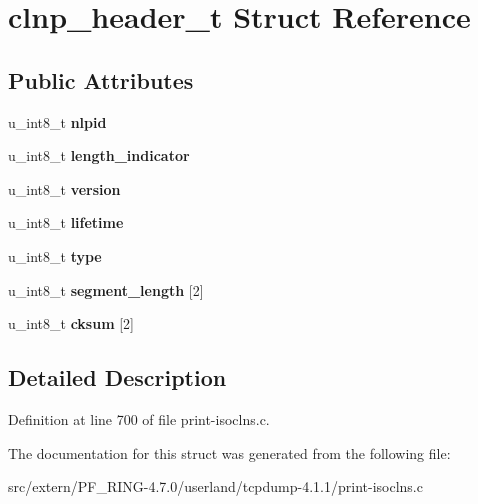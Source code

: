 \hypertarget{structclnp__header__t}{
\section{clnp\_\-header\_\-t Struct Reference}
\label{structclnp__header__t}
}
\subsection*{Public Attributes}
\begin{DoxyCompactItemize}
\item 
\hypertarget{structclnp__header__t_a5d27df53dae9d806715f28f4c4e5eb8e}{
u\_\-int8\_\-t {\bfseries nlpid}}
\label{structclnp__header__t_a5d27df53dae9d806715f28f4c4e5eb8e}

\item 
\hypertarget{structclnp__header__t_a40a00b200926c8148835cd9764cd0060}{
u\_\-int8\_\-t {\bfseries length\_\-indicator}}
\label{structclnp__header__t_a40a00b200926c8148835cd9764cd0060}

\item 
\hypertarget{structclnp__header__t_af775ecfe28fba4a4263f138527c36033}{
u\_\-int8\_\-t {\bfseries version}}
\label{structclnp__header__t_af775ecfe28fba4a4263f138527c36033}

\item 
\hypertarget{structclnp__header__t_a186f33f8f3effd02c2ec84c865b5825d}{
u\_\-int8\_\-t {\bfseries lifetime}}
\label{structclnp__header__t_a186f33f8f3effd02c2ec84c865b5825d}

\item 
\hypertarget{structclnp__header__t_a0897a3e09f106a9a04d8d122914b611a}{
u\_\-int8\_\-t {\bfseries type}}
\label{structclnp__header__t_a0897a3e09f106a9a04d8d122914b611a}

\item 
\hypertarget{structclnp__header__t_a736759b02d75add92050b742164f9de3}{
u\_\-int8\_\-t {\bfseries segment\_\-length} \mbox{[}2\mbox{]}}
\label{structclnp__header__t_a736759b02d75add92050b742164f9de3}

\item 
\hypertarget{structclnp__header__t_a955d700e85c9489f67fb6ef66b083234}{
u\_\-int8\_\-t {\bfseries cksum} \mbox{[}2\mbox{]}}
\label{structclnp__header__t_a955d700e85c9489f67fb6ef66b083234}

\end{DoxyCompactItemize}


\subsection{Detailed Description}


Definition at line 700 of file print-\/isoclns.c.



The documentation for this struct was generated from the following file:\begin{DoxyCompactItemize}
\item 
src/extern/PF\_\-RING-\/4.7.0/userland/tcpdump-\/4.1.1/print-\/isoclns.c\end{DoxyCompactItemize}
